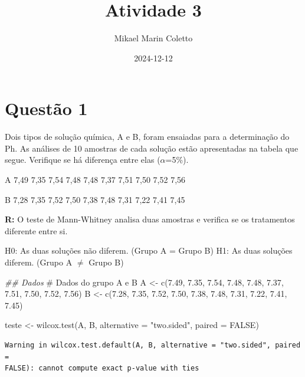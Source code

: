 \documentclass[
  letterpaper,
  DIV=11,
  numbers=noendperiod]{scrartcl}
\title{Atividade 3}
\author{Mikael Marin Coletto}
\date{2024-12-12}
\newenvironment{Shaded}{\begin{snugshade}}{\end{snugshade}}
\newcommand{\AttributeTok}[1]{\textcolor[rgb]{0.40,0.45,0.13}{#1}}
\newcommand{\CommentTok}[1]{\textcolor[rgb]{0.37,0.37,0.37}{#1}}
\newcommand{\ConstantTok}[1]{\textcolor[rgb]{0.56,0.35,0.01}{#1}}
\newcommand{\DocumentationTok}[1]{\textcolor[rgb]{0.37,0.37,0.37}{\textit{#1}}}
\newcommand{\FloatTok}[1]{\textcolor[rgb]{0.68,0.00,0.00}{#1}}
\newcommand{\FunctionTok}[1]{\textcolor[rgb]{0.28,0.35,0.67}{#1}}
\newcommand{\NormalTok}[1]{\textcolor[rgb]{0.00,0.23,0.31}{#1}}
\newcommand{\OtherTok}[1]{\textcolor[rgb]{0.00,0.23,0.31}{#1}}
\newcommand{\StringTok}[1]{\textcolor[rgb]{0.13,0.47,0.30}{#1}}
\begin{document}
\maketitle


\section{Questão 1}\label{questuxe3o-1}

Dois tipos de solução química, A e B, foram ensaiadas para a
determinação do Ph. As análises de 10 amostras de cada solução estão
apresentadas na tabela que segue. Verifique se há diferença entre elas
(\(\alpha\)=5\%).

A 7,49 7,35 7,54 7,48 7,48 7,37 7,51 7,50 7,52 7,56

B 7,28 7,35 7,52 7,50 7,38 7,48 7,31 7,22 7,41 7,45

\textbf{R:} O teste de Mann-Whitney analisa duas amostras e verifica se
os tratamentos diferente entre si.

H0: As duas soluções não diferem. (Grupo A = Grupo B) H1: As duas
soluções diferem. (Grupo A \(\neq\) Grupo B)

\begin{Shaded}
\begin{Highlighting}[]
\DocumentationTok{\#\# Dados}
\CommentTok{\# Dados do grupo A e B}
\NormalTok{A }\OtherTok{\textless{}{-}} \FunctionTok{c}\NormalTok{(}\FloatTok{7.49}\NormalTok{, }\FloatTok{7.35}\NormalTok{, }\FloatTok{7.54}\NormalTok{, }\FloatTok{7.48}\NormalTok{, }\FloatTok{7.48}\NormalTok{, }\FloatTok{7.37}\NormalTok{, }\FloatTok{7.51}\NormalTok{, }\FloatTok{7.50}\NormalTok{, }\FloatTok{7.52}\NormalTok{, }\FloatTok{7.56}\NormalTok{)}
\NormalTok{B }\OtherTok{\textless{}{-}} \FunctionTok{c}\NormalTok{(}\FloatTok{7.28}\NormalTok{, }\FloatTok{7.35}\NormalTok{, }\FloatTok{7.52}\NormalTok{, }\FloatTok{7.50}\NormalTok{, }\FloatTok{7.38}\NormalTok{, }\FloatTok{7.48}\NormalTok{, }\FloatTok{7.31}\NormalTok{, }\FloatTok{7.22}\NormalTok{, }\FloatTok{7.41}\NormalTok{, }\FloatTok{7.45}\NormalTok{)}

\NormalTok{teste }\OtherTok{\textless{}{-}} \FunctionTok{wilcox.test}\NormalTok{(A, B, }\AttributeTok{alternative =} \StringTok{"two.sided"}\NormalTok{, }\AttributeTok{paired =} \ConstantTok{FALSE}\NormalTok{)}
\end{Highlighting}
\end{Shaded}

\begin{verbatim}
Warning in wilcox.test.default(A, B, alternative = "two.sided", paired =
FALSE): cannot compute exact p-value with ties
\end{verbatim}
\end{document}
